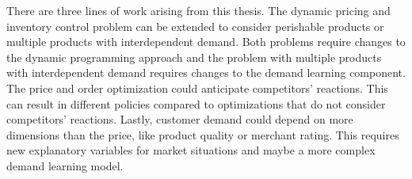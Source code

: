 There are three lines of work arising from this thesis.
The dynamic pricing and inventory control problem can be extended to consider perishable products or multiple products with interdependent demand.
Both problems require changes to the dynamic programming approach and the problem with multiple products with interdependent demand requires changes to the demand learning component.
The price and order optimization could anticipate competitors' reactions.
This can result in different policies compared to optimizations that do not consider competitors' reactions.
Lastly, customer demand could depend on more dimensions than the price, like product quality or merchant rating.
This requires new explanatory variables for market situations and maybe a more complex demand learning model.



